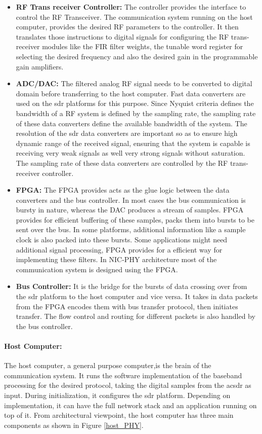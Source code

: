 \begin{itemize}
\item{\textbf{\ac{RF} Trans receiver Controller:} The controller provides the interface to control the \ac{RF} Transceiver.
The communication system running on the host computer, provides the desired RF parameters to the controller.
It then translates those instructions to digital signals for configuring the RF trans-receiver modules like the \ac{FIR} filter weights, the tunable word register for selecting the desired frequency and also the desired gain in the programmable gain amplifiers.
}

\item{\textbf{ADC/DAC:} The filtered analog \ac{RF} signal needs to be converted to digital domain before transferring to the host computer.
Fast data converters are used on the \ac{sdr} platforms for this purpose.
Since Nyquist criteria defines the bandwidth of a \ac{RF} system is defined by the sampling rate, the sampling rate of these data converters define the available bandwidth of the system.
The resolution of the \ac{sdr} data converters are important so as to ensure high dynamic range of the received signal, ensuring that the system is capable is receiving very weak signals as well very strong signals without saturation.
The sampling rate of these data converters are controlled by the \ac{RF} trans-receiver controller.
}
\item{\textbf{\ac{FPGA}:} The \ac{FPGA} provides acts as the glue logic between the data converters and the bus controller.
In most cases the bus communication is bursty in nature, whereas the \ac{DAC} produces a stream of samples.
\ac{FPGA} provides for efficient buffering of these samples, packs them into bursts to be sent over the bus.
In some platforms, additional information like a sample clock is also packed into these bursts.
Some applications might need additional signal processing, \ac{FPGA} provides for a efficient way for implementing these filters.
In NIC-PHY architecture most of the communication system is designed using the \ac{FPGA}.
}
\item{\textbf{Bus Controller:} It is the bridge for the bursts of data crossing over from the \ac{sdr} platform to the host computer and vice versa.
It takes in data packets from the \ac{FPGA} encodes them with bus transfer protocol, then initiates transfer.
The flow control and routing for different packets is also handled by the bus controller.}
\end{itemize}

\paragraph{Host Computer:} The host computer, a general purpose computer,is the brain of the communication system.
It runs the software implementation of the baseband processing for the desired protocol, taking the digital samples from the ac{sdr} as input.
During initialization, it configures the \ac{sdr} platform.
Depending on implementation, it can have the full network stack and an application running on top of it.
From architectural viewpoint, the host computer has three main components as shown in Figure \ref{host_PHY}.

